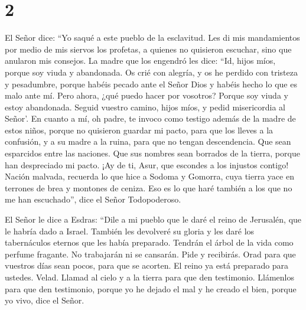 \hypertarget{section-1}{%
\section{2}\label{section-1}}

 El Señor dice: ``Yo saqué a este pueblo de la esclavitud.
Les di mis mandamientos por medio de mis siervos los profetas, a quienes
no quisieron escuchar, sino que anularon mis consejos.  La
madre que los engendró les dice: ``Id, hijos míos, porque soy viuda y
abandonada.  Os crié con alegría, y os he perdido con
tristeza y pesadumbre, porque habéis pecado ante el Señor Dios y habéis
hecho lo que es malo ante mí.  Pero ahora, ¿qué puedo
hacer por vosotros? Porque soy viuda y estoy abandonada. Seguid vuestro
camino, hijos míos, y pedid misericordia al Señor'.  En
cuanto a mí, oh padre, te invoco como testigo además de la madre de
estos niños, porque no quisieron guardar mi pacto,  para
que los lleves a la confusión, y a su madre a la ruina, para que no
tengan descendencia.  Que sean esparcidos entre las
naciones. Que sus nombres sean borrados de la tierra, porque han
despreciado mi pacto.  ¡Ay de ti, Asur, que escondes a los
injustos contigo! Nación malvada, recuerda lo que hice a Sodoma y
Gomorra,  cuya tierra yace en terrones de brea y montones
de ceniza. Eso es lo que haré también a los que no me han escuchado'',
dice el Señor Todopoderoso.

 El Señor le dice a Esdras: ``Dile a mi pueblo que le
daré el reino de Jerusalén, que le habría dado a Israel. 
También les devolveré su gloria y les daré los tabernáculos eternos que
les había preparado.  Tendrán el árbol de la vida como
perfume fragante. No trabajarán ni se cansarán.  Pide y
recibirás. Orad para que vuestros días sean pocos, para que se acorten.
El reino ya está preparado para ustedes. Velad.  Llamad
al cielo y a la tierra para que den testimonio. Llámenlos para que den
testimonio, porque yo he dejado el mal y he creado el bien, porque yo
vivo, dice el Señor.

